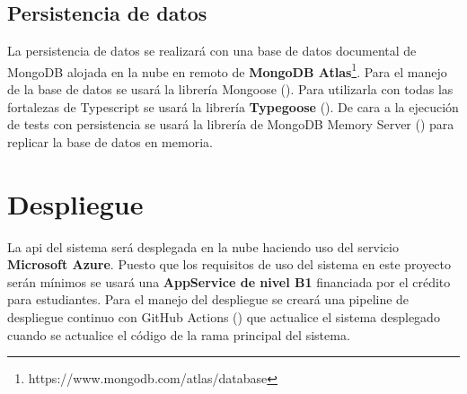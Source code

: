 \subsection{Persistencia de datos}

La persistencia de datos se realizará con una base de datos documental de MongoDB alojada en la nube en remoto de \textbf{MongoDB Atlas}\footnote{https://www.mongodb.com/atlas/database}. Para el manejo de la base de datos se usará la librería Mongoose (). Para utilizarla con todas las fortalezas de Typescript se usará la librería \textbf{Typegoose} (). De cara a la ejecución de tests con persistencia se usará la librería de MongoDB Memory Server () para replicar la base de datos en memoria.

\section{Despliegue}

La \acrshort{api} del sistema será desplegada en la nube haciendo uso del servicio \textbf{Microsoft Azure}. Puesto que los requisitos de uso del sistema en este proyecto serán mínimos se usará una \textbf{AppService de nivel B1} financiada por el crédito para estudiantes. Para el manejo del despliegue se creará una pipeline de despliegue continuo con GitHub Actions () que actualice el sistema desplegado cuando se actualice el código de la rama principal del sistema.